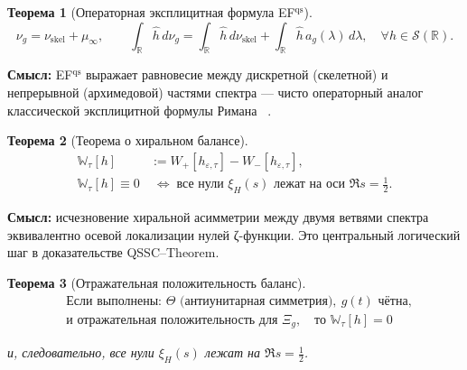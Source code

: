 \documentclass{article}
\numberwithin{equation}{section}
\theoremstyle{plain}
\newtheorem{theorem}{Теорема}
\theoremstyle{definition}
\theoremstyle{remark}
\def\infty{∞}\def\partial{∂}\def\sum{Σ}\def\int{∫}%
\begin{document}
\begin{theorem}[Операторная эксплицитная формула EF$^{\mathrm{qs}}$]
\label{thm:EFqs_summary}
\begin{equation}
\boxed{
\nu_g=\nu_{\mathrm{skel}}+\mu_\infty,
\qquad
\int_{\mathbb R}\widehat h\,d\nu_g
=\int_{\mathbb R}\widehat h\,d\nu_{\mathrm{skel}}
+\int_{\mathbb R}\widehat h\,a_g(\lambda)\,d\lambda,
\quad \forall h\in\mathcal S(\mathbb R).
}
\end{equation}
\end{theorem}

\noindent
\textbf{Смысл:} EF$^{\mathrm{qs}}$ выражает равновесие между дискретной (скелетной) и непрерывной (архимедовой) частями спектра —
чисто операторный аналог классической эксплицитной формулы Римана ~\cite{Weil1952}.
 
\begin{theorem}[Теорема о хиральном балансе]
\label{thm:balance_summary}
\begin{equation}
	\boxed{
		\begin{aligned}
			\mathbb W_\tau[h]
			&:=W_+[h_{\varepsilon,\tau}]-W_-[h_{\varepsilon,\tau}],\\[0.3em]
			\mathbb W_\tau[h]\equiv0
			&\;\Longleftrightarrow\;
			\text{все нули }\xi_H(s)\text{ лежат на оси }\Re s=\tfrac12.
		\end{aligned}
	}
\end{equation}

\end{theorem}

\noindent
\textbf{Смысл:} исчезновение хиральной асимметрии между двумя ветвями спектра ~\cite{Atiyah1975}
эквивалентно осевой локализации нулей ζ-функции.  
Это центральный логический шаг в доказательстве QSSC–Theorem.

\begin{theorem}[Отражательная положительность \implies баланс]
\label{thm:RPbalance}
\begin{equation}
	\boxed{
		\begin{aligned}
			&\text{Если выполнены: }\Theta\text{ (антиунитарная симметрия)},\ g(t)\text{ чётна},\\
			&\text{и отражательная положительность для }\Xi_g,\quad\text{то }\mathbb W_\tau[h]=0
		\end{aligned}
	}
\end{equation}

\noindent
и, следовательно, все нули $\xi_H(s)$ лежат на $\Re s=\tfrac12$.
\end{theorem}
~\cite{Osterwalder1973}
\end{document}
